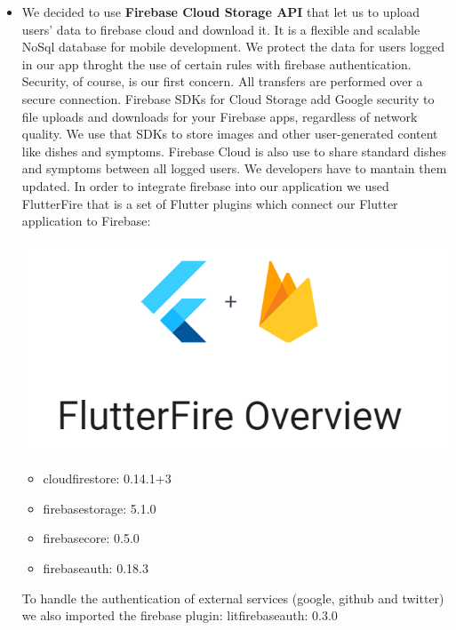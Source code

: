 \documentclass [12pt]{article}
\begin{document}
\begin{itemize}
\item We decided to use \textbf{Firebase Cloud Storage API} that let us to upload  users' data to firebase cloud and download it. It is a flexible and scalable NoSql database for mobile development. We protect the data for users logged in our app throght the use of certain rules with firebase authentication. Security, of course, is our first concern. All transfers are performed over a secure connection.
Firebase SDKs for Cloud Storage add Google security to file uploads and downloads for your Firebase apps, regardless of network quality. We use that SDKs to store images and other user-generated content like dishes and symptoms. 
Firebase Cloud is also use to share standard dishes and symptoms  between all logged users. We developers have to mantain them updated. 
In order to integrate firebase into our application we used FlutterFire that is a set of Flutter plugins which connect our Flutter application to Firebase:
\\
\begin{minipage}{0.3\linewidth}
    \includegraphics[width=\linewidth]{FlutterAndFirebase.PNG}
\end{minipage}\hfil
\begin{minipage}{0.55\linewidth}
\begin{itemize}[•]
\item cloud\textunderscore firestore: 0.14.1+3
\item firebase\textunderscore storage: 5.1.0
\item firebase\textunderscore core: 0.5.0
\item firebase\textunderscore auth: 0.18.3
\end{itemize}
\end{minipage}

To handle the authentication of external services (google, github and twitter) we also imported the firebase plugin: lit\textunderscore firebase\textunderscore auth: 0.3.0 
\\


\end{itemize}
\end{document}
